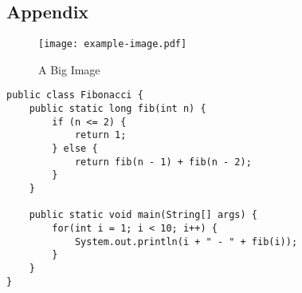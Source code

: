 \begin{appendices}
\section{Appendix}
\pagebreak

\begin{figure}[H]
	\centering
	 \caption{A Big Image}
	\texttt{[image: example-image.pdf]}
	\label{fig:appendixImage}
\end{figure}

\begin{lstlisting}[caption={Fibonacci}, label={lst:fibAppendix}, captionpos=t]
public class Fibonacci {
	public static long fib(int n) {
		if (n <= 2) {
			return 1;
		} else {
			return fib(n - 1) + fib(n - 2);
		}
	}

	public static void main(String[] args) {
		for(int i = 1; i < 10; i++) {
			System.out.println(i + " - " + fib(i));
		}
	}
}
\end{lstlisting}
\end{appendices}
